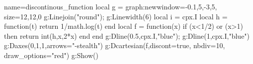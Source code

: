 \documentclass[12pt]{standalone}%
\begin{document}
\begin{luadraw}{name=discontinous_function}
local g = graph:new{window={-0.1,5,-3,5}, size={12,12,0}}
g:Linejoin("round"); g:Linewidth(6)
local i = cpx.I
local h = function(t) return 1/math.log(t) end
local f = function(x) if (x<1/2) or (x>1) then return int(h,x,2*x) end end
g:Dline({0.5,cpx.I},"blue"); g:Dline({1,cpx.I},"blue")
g:Daxes({0,1,1},{arrows="-stealth"})
g:Dcartesian(f,{discont=true, nbdiv=10, draw_options="red"})
g:Show()
\end{luadraw}
\end{document}
